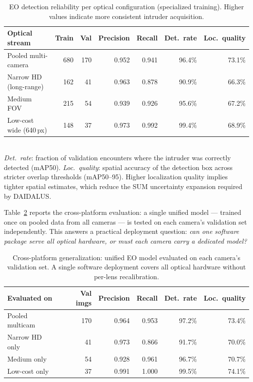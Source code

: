 \begin{table}[ht]
  \centering
  \caption{EO detection reliability per optical configuration (specialized training). Higher values indicate more consistent intruder acquisition.}
  \label{tab:eo-specialized}
  \begin{tabular}{lrrrrrr}
    \hline
    \textbf{Optical stream} & \textbf{Train} & \textbf{Val} & \textbf{Precision} & \textbf{Recall} & \textbf{Det.\ rate} & \textbf{Loc.\ quality} \\
    \hline
    Pooled multi-camera  & 680 & 170 & 0.952 & 0.941 & 96.4\% & 73.1\% \\
    Narrow HD (long-range)& 162 &  41 & 0.963 & 0.878 & 90.9\% & 66.3\% \\
    Medium FOV            & 215 &  54 & 0.939 & 0.926 & 95.6\% & 67.2\% \\
    Low-cost wide (640\,px)& 148 & 37 & 0.973 & 0.992 & 99.4\% & 68.9\% \\
    \hline
  \end{tabular}
  \\[4pt]
  \footnotesize \emph{Det.\ rate}: fraction of validation encounters where the intruder was correctly detected (mAP50). \emph{Loc.\ quality}: spatial accuracy of the detection box across stricter overlap thresholds (mAP50--95). Higher localization quality implies tighter spatial estimates, which reduce the SUM uncertainty expansion required by DAIDALUS.
\end{table}

Table~\ref{tab:eo-crossval} reports the cross-platform evaluation: a single unified model --- trained once on pooled data from all cameras --- is tested on each camera's validation set independently. This answers a practical deployment question: \emph{can one software package serve all optical hardware, or must each camera carry a dedicated model?}

\begin{table}[ht]
  \centering
  \caption{Cross-platform generalization: unified EO model evaluated on each camera's validation set. A single software deployment covers all optical hardware without per-lens recalibration.}
  \label{tab:eo-crossval}
  \begin{tabular}{lrrrrr}
    \hline
    \textbf{Evaluated on} & \textbf{Val imgs} & \textbf{Precision} & \textbf{Recall} & \textbf{Det.\ rate} & \textbf{Loc.\ quality} \\
    \hline
    Pooled multicam & 170 & 0.964 & 0.953 & 97.2\% & 73.4\% \\
    Narrow HD only  &  41 & 0.973 & 0.866 & 91.7\% & 70.0\% \\
    Medium only     &  54 & 0.928 & 0.961 & 96.7\% & 70.7\% \\
    Low-cost only   &  37 & 0.991 & 1.000 & 99.5\% & 74.1\% \\
    \hline
  \end{tabular}
\end{table}

